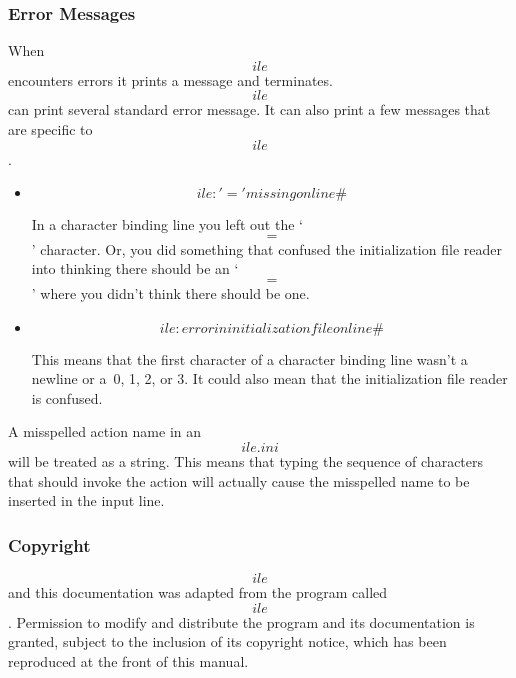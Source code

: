 \subsubsection{Error Messages}
     When \[ile\] encounters errors it  prints  a  message	and  terminates.	\[ile\]  can print several standard error message. It
     can also print a few messages that are specific to \[ile\].

\begin{itemize}
\item     \[ile: '=' missing on line \#\]

			 In a character binding line you left out
			 the `\[=\]' character. Or, you did something
			 that confused	the  initialization  file
			 reader	 into thinking there should be an
			 `\[=\]' where you didn't think there  should
			 be one.


\item     \[ile: error in initialization file on line \#\]

			 This means that the first character of a
			 character  binding line wasn't a newline
			 or a~0, 1, 2,  or  3.	It  could
			 also  mean  that the initialization file
			 reader is confused.

\end{itemize}



     A misspelled action name in an \[ile.ini\] will be  treated  as	a
     string.   This  means that typing the sequence of characters
     that should  invoke  the  action  will  actually  cause  the
     misspelled name to be inserted in the input line.

\subsubsection{Copyright}

\[ile\] and this documentation was adapted from the program called
\[ile\].  Permission to modify and distribute the program and its
documentation is granted, subject to the inclusion of its copyright
notice, which has been reproduced at the front of this manual.
